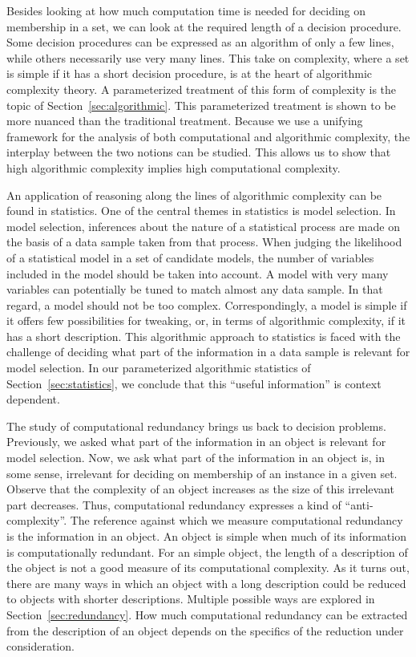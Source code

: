Besides looking at how much computation time is needed for deciding on membership in a set, we can look at the required length of a decision procedure.
Some decision procedures can be expressed as an algorithm of only a few lines, while others necessarily use very many lines.
This take on complexity, where a set is simple if it has a short decision procedure, is at the heart of algorithmic complexity theory.
A parameterized treatment of this form of complexity is the topic of Section~\ref{sec:algorithmic}.
This parameterized treatment is shown to be more nuanced than the traditional treatment.
Because we use a unifying framework for the analysis of both computational and algorithmic complexity, the interplay between the two notions can be studied.
This allows us to show that high algorithmic complexity implies high computational complexity.

An application of reasoning along the lines of algorithmic complexity can be found in statistics.
One of the central themes in statistics is model selection.
In model selection, inferences about the nature of a statistical process are made on the basis of a data sample taken from that process.
When judging the likelihood of a statistical model in a set of candidate models, the number of variables included in the model should be taken into account.
A model with very many variables can potentially be tuned to match almost any data sample.
In that regard, a model should not be too complex.
Correspondingly, a model is simple if it offers few possibilities for tweaking, or, in terms of algorithmic complexity, if it has a short description.
This algorithmic approach to statistics is faced with the challenge of deciding what part of the information in a data sample is relevant for model selection.
In our parameterized algorithmic statistics of Section~\ref{sec:statistics}, we conclude that this \enquote{useful information} is context dependent.

The study of computational redundancy brings us back to decision problems.
Previously, we asked what part of the information in an object is relevant for model selection.
Now, we ask what part of the information in an object is, in some sense, irrelevant for deciding on membership of an instance in a given set.
Observe that the complexity of an object increases as the size of this irrelevant part decreases.
Thus, computational redundancy expresses a kind of \enquote{anti-complexity}.
The reference against which we measure computational redundancy is the information in an object.
An object is simple when much of its information is computationally redundant.
For an simple object, the length of a description of the object is not a good measure of its computational complexity.
As it turns out, there are many ways in which an object with a long description could be reduced to objects with shorter descriptions.
Multiple possible ways are explored in Section~\ref{sec:redundancy}.
How much computational redundancy can be extracted from the description of an object depends on the specifics of the reduction under consideration.

